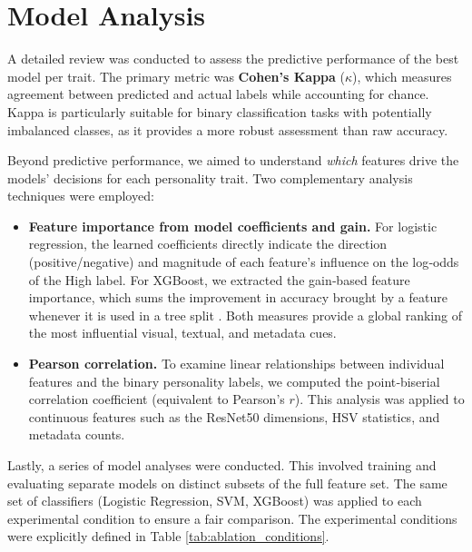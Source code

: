 \section{Model Analysis}
\label{subsec:analysis}
A detailed review was conducted to assess the predictive performance of the best model per trait. The primary metric was \textbf{Cohen's Kappa} (\(\kappa\)), which measures agreement between predicted and actual labels while accounting for chance. Kappa is particularly suitable for binary classification tasks with potentially imbalanced classes, as it provides a more robust assessment than raw accuracy.

Beyond predictive performance, we aimed to understand \textit{which} features drive the models’ decisions for each personality trait. Two complementary analysis techniques were employed:

\begin{itemize}
	\item \textbf{Feature importance from model coefficients and gain.} For logistic regression, the learned coefficients directly indicate the direction (positive/negative) and magnitude of each feature’s influence on the log‑odds of the High label. For XGBoost, we extracted the gain‑based feature importance, which sums the improvement in accuracy brought by a feature whenever it is used in a tree split \citep{chen2016}. Both measures provide a global ranking of the most influential visual, textual, and metadata cues.
	\item \textbf{Pearson correlation.} To examine linear relationships between individual features and the binary personality labels, we computed the point‑biserial correlation coefficient (equivalent to Pearson’s \(r\)). This analysis was applied to continuous features such as the ResNet50 dimensions, HSV statistics, and metadata counts.
\end{itemize}

Lastly, a series of model analyses were conducted. This involved training and evaluating separate models on distinct subsets of the full feature set. The same set of classifiers (Logistic Regression, SVM, XGBoost) was applied to each experimental condition to ensure a fair comparison. The experimental conditions were explicitly defined in Table \ref{tab:ablation_conditions}.

